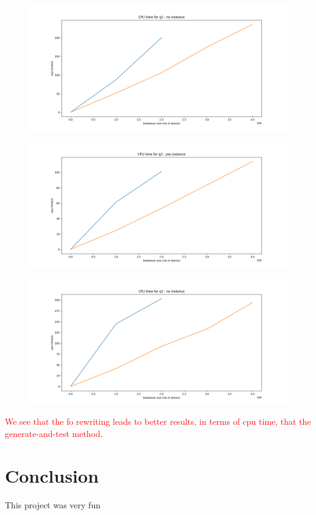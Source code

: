 \begin{figure}[h]
\includegraphics[width=\textwidth]{time_q2_noinstance.png}
\centering
\end{figure}

\begin{figure}[h]
\includegraphics[width=\textwidth]{time_q3_yesinstance.png}
\centering
\end{figure}

\begin{figure}[h]
\includegraphics[width=\textwidth]{time_q3_noinstance.png}
\centering
\end{figure}

\textcolor{red}{We see that the fo rewriting leads to better results, in terms of cpu time, that the generate-and-test method.}

\section{Conclusion}

This project was very fun